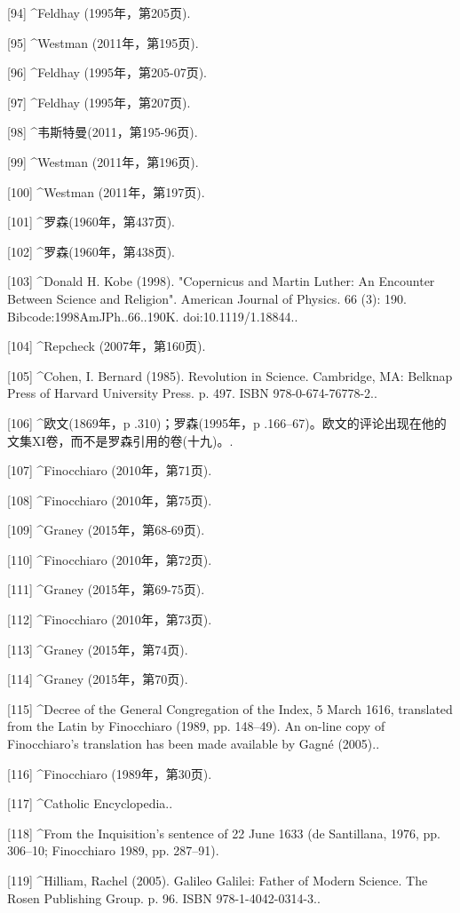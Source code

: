 [94]
^Feldhay (1995年，第205页).

[95]
^Westman (2011年，第195页).

[96]
^Feldhay (1995年，第205-07页).

[97]
^Feldhay (1995年，第207页).

[98]
^韦斯特曼(2011，第195-96页).

[99]
^Westman (2011年，第196页).

[100]
^Westman (2011年，第197页).

[101]
^罗森(1960年，第437页).

[102]
^罗森(1960年，第438页).

[103]
^Donald H. Kobe (1998). "Copernicus and Martin Luther: An Encounter Between Science and Religion". American Journal of Physics. 66 (3): 190. Bibcode:1998AmJPh..66..190K. doi:10.1119/1.18844..

[104]
^Repcheck (2007年，第160页).

[105]
^Cohen, I. Bernard (1985). Revolution in Science. Cambridge, MA: Belknap Press of Harvard University Press. p. 497. ISBN 978-0-674-76778-2..

[106]
^欧文(1869年，p .310)；罗森(1995年，p .166–67)。欧文的评论出现在他的文集XI卷，而不是罗森引用的卷(十九)。.

[107]
^Finocchiaro (2010年，第71页).

[108]
^Finocchiaro (2010年，第75页).

[109]
^Graney (2015年，第68-69页).

[110]
^Finocchiaro (2010年，第72页).

[111]
^Graney (2015年，第69-75页).

[112]
^Finocchiaro (2010年，第73页).

[113]
^Graney (2015年，第74页).

[114]
^Graney (2015年，第70页).

[115]
^Decree of the General Congregation of the Index, 5 March 1616, translated from the Latin by Finocchiaro (1989, pp. 148–49). An on-line copy of Finocchiaro's translation has been made available by Gagné (2005)..

[116]
^Finocchiaro (1989年，第30页).

[117]
^Catholic Encyclopedia..

[118]
^From the Inquisition's sentence of 22 June 1633 (de Santillana, 1976, pp. 306–10; Finocchiaro 1989, pp. 287–91).

[119]
^Hilliam, Rachel (2005). Galileo Galilei: Father of Modern Science. The Rosen Publishing Group. p. 96. ISBN 978-1-4042-0314-3..

